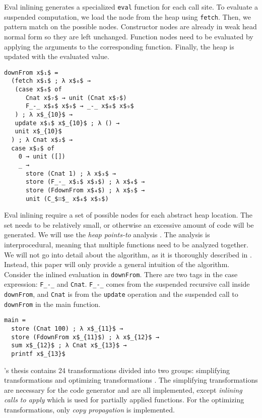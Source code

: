 \documentclass[10pt, twocolumn]{article}
\begin{document}
Eval inlining generates a specialized \lstinline{eval} function for each call site.
To evaluate a suspended computation, we load the node from the heap using \lstinline{fetch}. 
Then, we pattern match on the possible nodes. 
Constructor nodes are already in weak head normal form so they are left unchanged.
Function nodes need to be evaluated by applying the arguments to the corresponding function.
Finally, the heap is updated with the evaluated value.

\begin{lstlisting}[xleftmargin=24pt]
downFrom x$₁$ =
  (fetch x$₁$ ; λ x$₆$ →
   (case x$₆$ of
      Cnat x$₇$ → unit (Cnat x$₇$)
      F_-_ x$₈$ x$₉$ → _-_ x$₈$ x$₉$
   ) ; λ x$_{10}$ →
   update x$₁$ x$_{10}$ ; λ () →
   unit x$_{10}$
  ) ; λ Cnat x$₂$ →
  case x$₂$ of
    0 → unit ([])
    _ →
      store (Cnat 1) ; λ x$₃$ →
      store (F_-_ x$₁$ x$₃$) ; λ x$₄$ →
      store (FdownFrom x$₄$) ; λ x$₅$ →
      unit (C_$∷$_ x$₄$ x$₅$)
\end{lstlisting}

Eval inlining require a set of possible nodes for each abstract heap location.
The set needs to be relatively small, or otherwise an excessive amount of code will be generated.
We will use the \emph{heap points-to} analysis \citep{johnsson1991}.
The analysis is interprocedural, meaning that multiple functions need to be analyzed together.
We will not go into detail about the algorithm, as it is thoroughly described in \citep{boquist1996}. 
Instead, this paper will only provide a general intuition of the algorithm.
Consider the inlined evaluation in \lstinline{downFrom}.
There are two tags in the case expression: \lstinline{F_-_} and \lstinline{Cnat}. 
\lstinline{F_-_} comes from the suspended recursive call inside \lstinline{downFrom}, and 
\lstinline{Cnat} is from the \lstinline{update} operation and the suspended call to \lstinline{downFrom} in the main function.

\begin{lstlisting}[xleftmargin=24pt]
main =
  store (Cnat 100) ; λ x$_{11}$ →
  store (FdownFrom x$_{11}$) ; λ x$_{12}$ →
  sum x$_{12}$ ; λ Cnat x$_{13}$ →
  printf x$_{13}$
\end{lstlisting}

\citeauthor{boquist1999}'s thesis contains 24 transformations divided into two groups: simplifying transformations and optimizing 
transformations \citep{boquist1999}. 
The simplifying transformations are necessary for the code generator and are all implemented, except \emph{inlining calls to apply}
which is used for partially applied functions. 
For the optimizing transformations, only \emph{copy propagation} is implemented.
\end{document}
